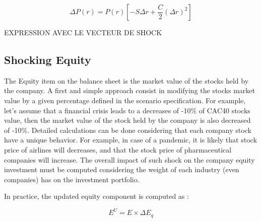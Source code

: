 \begin{equation}
	 \Delta P(r) = P(r) \left[ -S \Delta r + \frac{C}{2} (\Delta r)^2 \right]
\end{equation}


EXPRESSION AVEC LE VECTEUR DE SHOCK



\subsection{Shocking Equity}
\label{sec:EQ_SHOCK}

The Equity item on the balance sheet is the market value of the stocks held by the company. A first and simple approach consist in modifying the stocks market value by a given percentage defined in the scenario specification. For example, let's assume that a financial crisis leads to a decreases of -10\% of CAC40 stocks value, then the market value of the stock held by the company is also decreased of -10\%. Detailed calculations can be done considering that each company stock have a unique behavior. For example, in case of a pandemic, it is likely that stock price of airlines will decreases, and that the stock price of pharmaceutical companies will increase. The overall impact of such shock on the company equity investment must be computed considering the weight of each industry (even companies) has on the investment portfolio.

In practice, the updated equity component is computed as :

\begin{equation}
    E^U = E \times \Delta E_q
\end{equation}